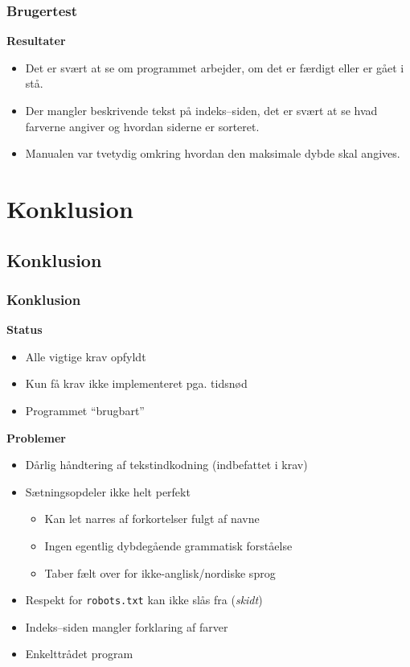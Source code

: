 \documentclass{beamer}
\begin{document}
\begin{frame}
  \frametitle{Brugertest}
  \textbf{Resultater}
  \begin{itemize}
  \item Det er svært at se om programmet arbejder, om det er færdigt
    eller er gået i stå.
  \item Der mangler beskrivende tekst på indeks--siden, det er svært
    at se hvad farverne angiver og hvordan siderne er sorteret.
  \item Manualen var tvetydig omkring hvordan den maksimale dybde skal
    angives.
  \end{itemize}

\end{frame}

\section{Konklusion}
\subsection{Konklusion}
\begin{frame}
  \frametitle{Konklusion}

  \textbf{Status}

  \begin{itemize}
  \item<1-> Alle vigtige krav opfyldt
  \item<2-> Kun få krav ikke implementeret pga. tidsnød
  \item<3-> Programmet ``brugbart''
  \end{itemize}
\pause
\pause
\pause
  \textbf{Problemer}

  \begin{itemize}
  \item<4-> Dårlig håndtering af tekstindkodning (indbefattet i krav)
  \item<5-> Sætningsopdeler ikke helt perfekt
    \begin{itemize}
    \item<5-> Kan let narres af forkortelser fulgt af navne
    \item<5-> Ingen egentlig dybdegående grammatisk forståelse
    \item<5-> Taber fælt over for ikke-anglisk/nordiske sprog
    \end{itemize}
  \item<6-> Respekt for \texttt{robots.txt} kan ikke slås fra (\textit{skidt})
  \item<6-> Indeks--siden mangler forklaring af farver
  \item<6-> Enkelttrådet program
  \end{itemize}
\end{frame}
\end{document}
